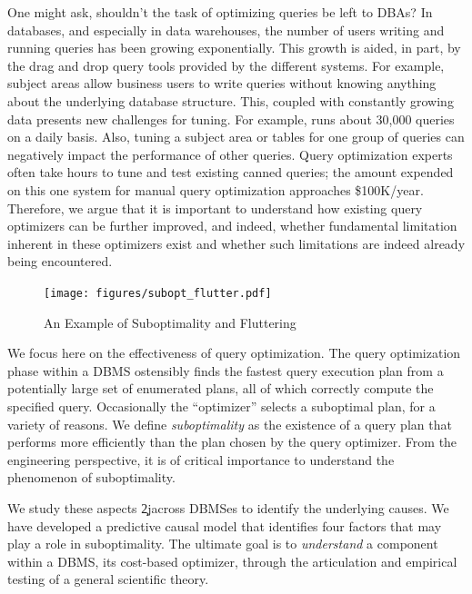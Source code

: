 \documentclass[prodmode,acmtods]{acmsmall}
\begin{document}
One might ask, shouldn't the task of optimizing queries be left to DBAs?  In
databases, and especially in data warehouses, the number of users writing
and running queries has been growing exponentially. This growth is aided, in
part, by the drag and drop query tools provided by the different
systems. For example, subject areas allow business users to write queries
without knowing anything about the underlying database structure. This,
coupled with constantly growing data presents new challenges for tuning. For
example,  runs about
30,000 queries on a daily basis. 
Also, tuning a subject area or tables for one group of queries can
negatively impact the performance of other queries. Query optimization experts often take hours to tune and test existing canned
queries; the amount expended on this one system for manual query optimization
approaches \$100K/year. Therefore, we argue that it is important to
understand how existing query optimizers can be further improved, and
indeed, whether  fundamental limitation inherent in these optimizers exist
and whether such limitations are indeed already being encountered.

\begin{figure}[t]
\centering
\texttt{[image: figures/subopt\_flutter.pdf]}
\caption{An Example of Suboptimality and Fluttering\label{fig:query769}}
\end{figure}

We focus here on the effectiveness of query
optimization. The query optimization phase within a \hbox{DBMS} ostensibly finds the fastest
query execution plan from a potentially large set of enumerated plans, all of
which correctly compute the specified query. Occasionally the \hbox{``optimizer''}
selects a suboptimal plan, for a variety of reasons. We define {\em
  suboptimality} as the existence of a query plan that performs more
efficiently than the plan chosen by the query optimizer. From the engineering
perspective, it is of critical importance to understand the phenomenon of
suboptimality.

We study these aspects \c2j{}{across \hbox{DBMSes}} to identify the
underlying causes. We have developed a predictive causal model that
identifies four 
factors that may play a role in suboptimality. The ultimate goal is to {\em
  understand} a component within a \hbox{DBMS}, its cost-based optimizer, through the
articulation and empirical testing of a general scientific theory.
\end{document}
